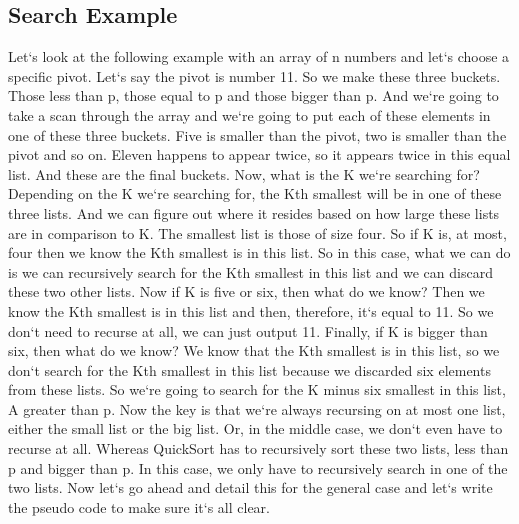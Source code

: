 \subsection{Search Example}
Let`s look at the following example with an array of n numbers and let`s choose a specific pivot.
Let`s say the pivot is number 11.
So we make these three buckets.
Those less than p, those equal to p and those bigger than p.
And we`re going to take a scan through the array and we`re going to put each of these elements in one of these three buckets.
Five is smaller than the pivot, two is smaller than the pivot and so on.
Eleven happens to appear twice, so it appears twice in this equal list.
And these are the final buckets.
Now, what is the K we`re searching for? Depending on the K we`re searching for, the Kth smallest will be in one of these three lists.
And we can figure out where it resides based on how large these lists are in comparison to K\@.
The smallest list is those of size four.
So if K is, at most, four then we know the Kth smallest is in this list.
So in this case, what we can do is we can recursively search for the Kth smallest in this list and we can discard these two other lists.
Now if K is five or six, then what do we know? Then we know the Kth smallest is in this list and then, therefore, it`s equal to 11.
So we don`t need to recurse at all, we can just output 11.
Finally, if K is bigger than six, then what do we know? We know that the Kth smallest is in this list, so we don`t search for the Kth smallest in this list because we discarded six elements from these lists.
So we`re going to search for the K minus six smallest in this list, A greater than p.
Now the key is that we`re always recursing on at most one list, either the small list or the big list.
Or, in the middle case, we don`t even have to recurse at all.
Whereas QuickSort has to recursively sort these two lists, less than p and bigger than p.
In this case, we only have to recursively search in one of the two lists.
Now let`s go ahead and detail this for the general case and let`s write the pseudo code to make sure it`s all clear.

